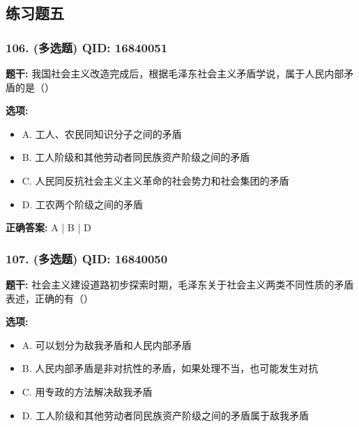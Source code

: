 \documentclass[12pt,UTF8]{ctexart}
\begin{document}
\subsection*{练习题五}

\subsubsection*{106. (多选题) \small QID: 16840051}

\textbf{题干:}
我国社会主义改造完成后，根据毛泽东社会主义矛盾学说，属于人民内部矛盾的是（）

\textbf{选项:}
\begin{itemize}[leftmargin=*]

  \item A. 工人、农民同知识分子之间的矛盾

  \item B. 工人阶级和其他劳动者同民族资产阶级之间的矛盾

  \item C. 人民同反抗社会主义主义革命的社会势力和社会集团的矛盾

  \item D. 工农两个阶级之间的矛盾

\end{itemize}

\textbf{正确答案:}
A | B | D

\vspace{0.3em}\hrulefill\vspace{0.7em}

\subsubsection*{107. (多选题) \small QID: 16840050}

\textbf{题干:}
社会主义建设道路初步探索时期，毛泽东关于社会主义两类不同性质的矛盾表述，正确的有（）

\textbf{选项:}
\begin{itemize}[leftmargin=*]

  \item A. 可以划分为敌我矛盾和人民内部矛盾

  \item B. 人民内部矛盾是非对抗性的矛盾，如果处理不当，也可能发生对抗

  \item C. 用专政的方法解决敌我矛盾

  \item D. 工人阶级和其他劳动者同民族资产阶级之间的矛盾属于敌我矛盾

\end{itemize}
\end{document}
